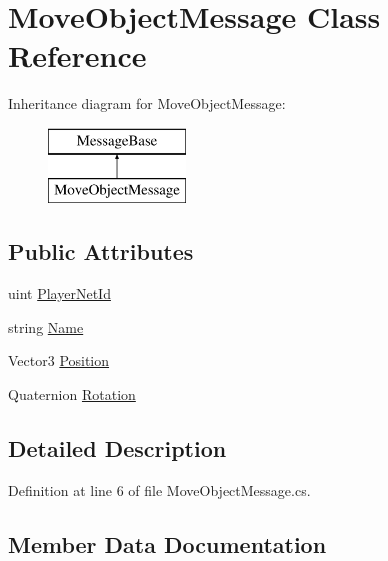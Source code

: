 \hypertarget{class_move_object_message}{}\section{Move\+Object\+Message Class Reference}
\label{class_move_object_message}
Inheritance diagram for Move\+Object\+Message\+:\begin{figure}[H]
\begin{center}
\leavevmode
\includegraphics[height=2.000000cm]{class_move_object_message}
\end{center}
\end{figure}
\subsection*{Public Attributes}
\begin{DoxyCompactItemize}
\item 
uint \mbox{\hyperlink{class_move_object_message_a431d0baf4f5d0b45ae8d4edda85edf97}{Player\+Net\+Id}}
\item 
string \mbox{\hyperlink{class_move_object_message_a8a7426826fe27cf64737e60c17b6aa3f}{Name}}
\item 
Vector3 \mbox{\hyperlink{class_move_object_message_a64834890d0b6424af90c5c39d0ca4413}{Position}}
\item 
Quaternion \mbox{\hyperlink{class_move_object_message_aa28c8b56da7e61efcd2cb3c6d14ee2c1}{Rotation}}
\end{DoxyCompactItemize}


\subsection{Detailed Description}


Definition at line 6 of file Move\+Object\+Message.\+cs.



\subsection{Member Data Documentation}
\mbox{\label{class_move_object_message_a8a7426826fe27cf64737e60c17b6aa3f}} 
